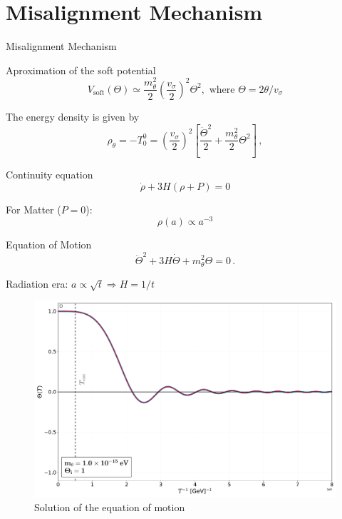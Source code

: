\section{Misalignment Mechanism}

\begin{frame}{Misalignment Mechanism}
\begin{block}{Aproximation of the soft potential}
    \begin{equation}
    V_{\textrm{soft}}(\Theta)\simeq \frac{m_\theta^2}{2}\left(\frac{v_\sigma}{2}\right)^2\Theta^2, \textrm{ where } \Theta=2\theta/v_\sigma
\end{equation}
\end{block}
The energy density is given by
\begin{equation}
    \rho_\theta=-T^0_0=\left(\dfrac{v_\sigma}{2}\right)^2\left[\dfrac{\dot{\Theta}^2}{2}+\dfrac{m_\theta^2}{2}\Theta^2\right]\,,
\end{equation}
\begin{block}{Continuity equation}
\begin{equation}
\dot{\rho}+3H(\rho+P)=0
\end{equation}
\end{block}
For Matter ($P=0$):
\begin{equation}
    \rho(a) \propto a^{-3}
\end{equation}
\end{frame}

\begin{frame}
\begin{block}{Equation of Motion}
    \begin{equation}
    \label{motion}
    \ddot{\Theta}^2+3H\dot{\Theta}+m_\theta^2\Theta=0\,.
\end{equation}
\end{block}
Radiation era: $a\propto \sqrt{t} \Rightarrow H=1/t$
 \begin{figure}
         \centering
         \includegraphics[width=.7\textwidth]{Figures/motion.pdf}
        \caption{Solution of the equation of motion}
        \label{fig:rot}
    \end{figure}
\end{frame}


